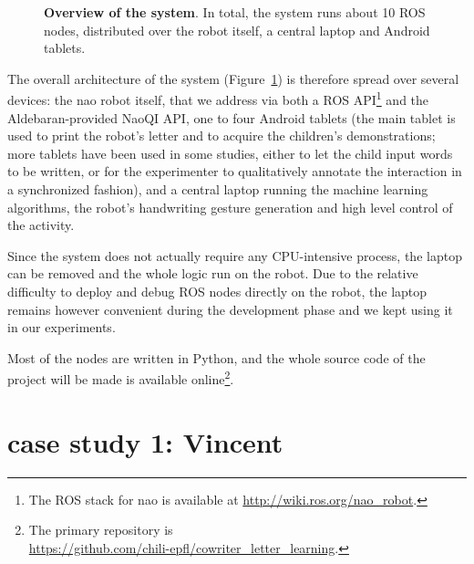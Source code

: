 \documentclass[conference]{IEEEtran}
\begin{document}
\begin{figure}[ht!]
{
}

\caption{\small \textbf{Overview of the system}. In total, the system runs about 10 ROS nodes,
    distributed over the robot itself, a central laptop and Android tablets.}

    \label{fig:archi}
\end{figure}

The overall architecture of the system (Figure~\ref{fig:archi}) is therefore
spread over several devices: the {\sc nao} robot itself, that we address via
both a ROS API\footnote{The ROS stack for {\sc nao} is available at 
\url{http://wiki.ros.org/nao_robot}.} and the Aldebaran-provided NaoQI API, one
to four Android tablets (the main tablet is used to print the robot's letter and
to acquire the children's demonstrations; more tablets have been used in some
studies, either to let the child input words to be written, or for the
experimenter to qualitatively annotate the interaction in a synchronized
fashion), and a central laptop running the machine learning algorithms, the
robot's handwriting gesture generation and high level control of the activity.

Since the system does not actually require any CPU-intensive process, the laptop
can be removed and the whole logic run on the robot. Due to the relative
difficulty to deploy and debug ROS nodes directly on the robot, the laptop
remains however convenient during the development phase and we kept using it in
our experiments.

Most of the nodes are written in Python, and the whole source code of the
project will be made is available online\footnote{The primary repository is\\ 
\url{https://github.com/chili-epfl/cowriter_letter_learning}.}.


\section{case study 1: Vincent}\label{Vincent}
\end{document}
